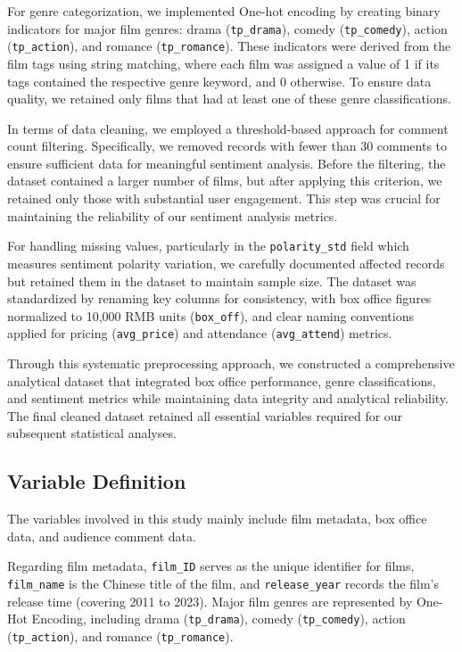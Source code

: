 \documentclass{article}
\begin{document}
For genre categorization, we implemented One-hot encoding by creating binary indicators for major film genres: drama (\texttt{tp\_drama}), comedy (\texttt{tp\_comedy}), action (\texttt{tp\_action}), and romance (\texttt{tp\_romance}). These indicators were derived from the film tags using string matching, where each film was assigned a value of 1 if its tags contained the respective genre keyword, and 0 otherwise. To ensure data quality, we retained only films that had at least one of these genre classifications.

In terms of data cleaning, we employed a threshold-based approach for comment count filtering. Specifically, we removed records with fewer than 30 comments to ensure sufficient data for meaningful sentiment analysis. Before the filtering, the dataset contained a larger number of films, but after applying this criterion, we retained only those with substantial user engagement. This step was crucial for maintaining the reliability of our sentiment analysis metrics.

For handling missing values, particularly in the \texttt{polarity\_std} field which measures sentiment polarity variation, we carefully documented affected records but retained them in the dataset to maintain sample size. The dataset was standardized by renaming key columns for consistency, with box office figures normalized to 10,000 RMB units (\texttt{box\_off}), and clear naming conventions applied for pricing (\texttt{avg\_price}) and attendance (\texttt{avg\_attend}) metrics.

Through this systematic preprocessing approach, we constructed a comprehensive analytical dataset that integrated box office performance, genre classifications, and sentiment metrics while maintaining data integrity and analytical reliability. The final cleaned dataset retained all essential variables required for our subsequent statistical analyses.

\subsection{Variable Definition}
The variables involved in this study mainly include film metadata, box office data, and audience comment data.

Regarding film metadata, \texttt{film\_ID} serves as the unique identifier for films, \texttt{film\_name} is the Chinese title of the film, and \texttt{release\_year} records the film's release time (covering 2011 to 2023). Major film genres are represented by One-Hot Encoding, including drama (\texttt{tp\_drama}), comedy (\texttt{tp\_comedy}), action (\texttt{tp\_action}), and romance (\texttt{tp\_romance}).
\end{document}

